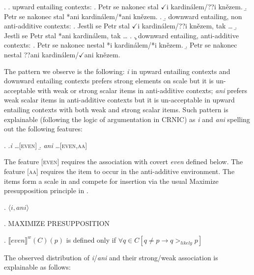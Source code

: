 \documentclass[12pt]{scrartcl}
\begin{document}
\ex. \a. upward entailing contexts:
\a. Petr se nakonec stal $\checkmark$i kardinálem/??i knězem.
\b. Petr se nakonec stal *ani kardinálem/*ani knězem.
\z.
\b. downward entailing, non anti-additive contexts:
\a. Jestli se Petr stal $\checkmark$i kardinálem/??i knězem, tak \ldots
\b. Jestli se Petr stal *ani kardinálem, tak \ldots
\z.
\c. downward entailing, anti-additive contexts:
\a. Petr se nakonec nestal *i kardinálem/*i knězem. 
\b. Petr se nakonec nestal ??ani kardinálem/$\checkmark$ani knězem.

The pattern we observe is the following: \textit{i} in upward entailing contexts and downward entailing contexts prefers strong elements on scale but it is un-acceptable with weak or strong scalar items in anti-additive contexts; \textit{ani} prefers weak scalar items in anti-additive contexts but it is un-acceptable in upward entailing contexts with both weak and strong scalar items. Such pattern is explainable (following the logic of argumentation in CRNIC) as \textit{i} and \textit{ani} spelling out the following features:

\ex. \a.\textit{i} \ldots [\textsc{even}]
\b. \textit{ani} \ldots [\textsc{even},\textsc{aa}]

The feature [\textsc{even}] requires the association with covert \textit{even} defined below. The feature [\textsc{aa}] requires the item to occur in the anti-additive environment. The items form a scale in \Next and compete for insertion via the usual Maximize presupposition principle in \NNext.

\ex. $\langle i,ani\rangle$

\ex. MAXIMIZE PRESUPPOSITION

\ex. \(\llbracket even\rrbracket ^w (C)(p)\) is defined only if
\(\forall q \in C[q \neq p \rightarrow q >_{likely} p]\)

The observed distribution of \textit{i}/\textit{ani} and their strong/weak association is explainable as follows:
\end{document}
